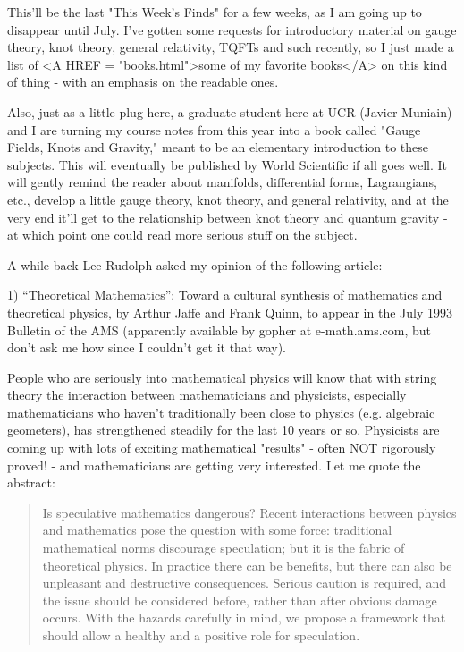 

This'll be the last "This Week's Finds" for a few weeks, as I am going up to
disappear until July.  I've gotten some requests for introductory
material on gauge theory, knot theory, general relativity, TQFTs and
such recently, so I just made a list
of <A HREF = "books.html">some of my favorite books</A> on this kind of 
thing - with an emphasis on the readable ones.  

Also, just as a little plug here, a graduate student here at UCR (Javier
Muniain) and I are turning my course notes from this year into a book
called "Gauge Fields, Knots and Gravity," meant to be an elementary
introduction to these subjects.  This will eventually be published by
World Scientific if all goes well.  It will gently remind the reader
about manifolds, differential forms, Lagrangians, etc., develop a little
gauge theory, knot theory, and general relativity, and at the very end
it'll get to the relationship between knot theory and quantum gravity -
at which point one could read more serious stuff on the subject.   

A while back Lee Rudolph asked my opinion of the following article:

1) ``Theoretical Mathematics'': Toward a cultural synthesis of
mathematics and theoretical physics, by Arthur Jaffe and Frank Quinn, to
appear in the July 1993 Bulletin of the AMS (apparently available by
gopher at e-math.ams.com, but don't ask me how since I couldn't get it
that way).

People who are seriously into mathematical physics will know that with
string theory the interaction between mathematicians and physicists,
especially mathematicians who haven't traditionally been close to
physics (e.g. algebraic geometers), has strengthened steadily for the
last 10 years or so.  Physicists are coming up with lots of exciting
mathematical "results" - often NOT rigorously proved! - and
mathematicians are getting very interested.  Let me quote the abstract:

\begin{quote}
Is speculative mathematics dangerous?  Recent interactions between
physics and mathematics pose the question with some force:  traditional
mathematical norms discourage speculation; but it is the fabric of
theoretical physics.  In practice there can be benefits, but there can also
be unpleasant and destructive consequences.  Serious caution is required,
and the issue should be considered before, rather than after obvious
damage occurs.  With the hazards carefully in mind, we propose a
framework that should allow a healthy and a positive role for speculation.
\end{quote}
    

